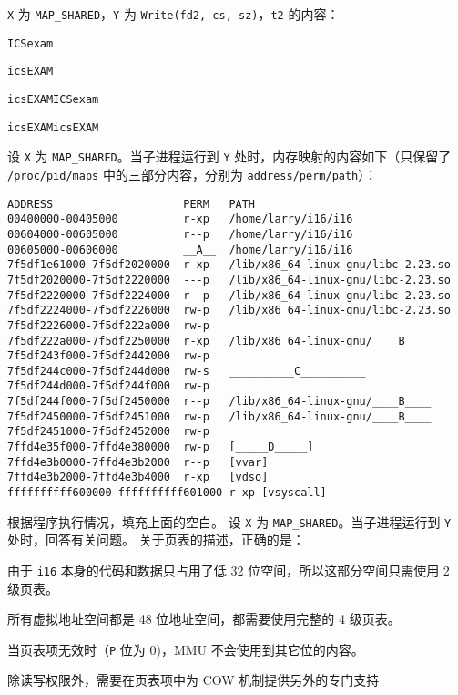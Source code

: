 \begin{problems}
            \subqn \verb|X| 为 \verb|MAP_SHARED|，\verb|Y| 为 \verb|Write(fd2, cs, sz)|，\verb|t2| 的内容：
            \begin{choices}
                \item \verb|ICSexam|
                \item \verb|icsEXAM|
                \item \verb|icsEXAMICSexam|
                \item \verb|icsEXAMicsEXAM|
            \end{choices}
        \qn 设 \verb|X| 为 \verb|MAP_SHARED|。当子进程运行到 \verb|Y| 处时，内存映射的内容如下（只保留了 \verb|/proc/pid/maps| 中的三部分内容，分别为 \verb|address/perm/path|）：
        \begin{verbatim}
ADDRESS                    PERM   PATH 
00400000-00405000          r-xp   /home/larry/i16/i16
00604000-00605000          r--p   /home/larry/i16/i16
00605000-00606000          __A__  /home/larry/i16/i16
7f5df1e61000-7f5df2020000  r-xp   /lib/x86_64-linux-gnu/libc-2.23.so
7f5df2020000-7f5df2220000  ---p   /lib/x86_64-linux-gnu/libc-2.23.so
7f5df2220000-7f5df2224000  r--p   /lib/x86_64-linux-gnu/libc-2.23.so
7f5df2224000-7f5df2226000  rw-p   /lib/x86_64-linux-gnu/libc-2.23.so
7f5df2226000-7f5df222a000  rw-p
7f5df222a000-7f5df2250000  r-xp   /lib/x86_64-linux-gnu/____B____
7f5df243f000-7f5df2442000  rw-p
7f5df244c000-7f5df244d000  rw-s   __________C__________
7f5df244d000-7f5df244f000  rw-p
7f5df244f000-7f5df2450000  r--p   /lib/x86_64-linux-gnu/____B____
7f5df2450000-7f5df2451000  rw-p   /lib/x86_64-linux-gnu/____B____
7f5df2451000-7f5df2452000  rw-p
7ffd4e35f000-7ffd4e380000  rw-p   [_____D_____]
7ffd4e3b0000-7ffd4e3b2000  r--p   [vvar]
7ffd4e3b2000-7ffd4e3b4000  r-xp   [vdso]
ffffffffff600000-ffffffffff601000 r-xp [vsyscall]
        \end{verbatim}
        根据程序执行情况，填充上面的空白。
        \qn 设 \verb|X| 为 \verb|MAP_SHARED|。当子进程运行到 \verb|Y| 处时，回答有关问题。
            \subqn 关于页表的描述，正确的是：
            \begin{choices}
                \item 由于 \verb|i16| 本身的代码和数据只占用了低 32 位空间，所以这部分空间只需使用 2 级页表。
                \item 所有虚拟地址空间都是 48 位地址空间，都需要使用完整的 4 级页表。
                \item 当页表项无效时（\verb|P| 位为 0)，MMU 不会使用到其它位的内容。
                \item 除读写权限外，需要在页表项中为 COW 机制提供另外的专门支持

\end{choices}
\end{problems}
